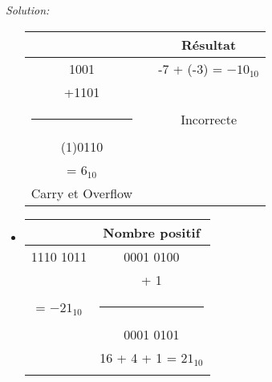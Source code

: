 \documentclass{article}
\newenvironment{solution}
    {\textit{Solution:}}
    {}
\begin{document}
\begin{solution}
\begin{itemize}
        \begin{tabular}{|c|c|c|}
        \hline
        &  & Résultat \\
        \hline
        \hspace{6pt}1001       &                         &       -7 + (-3) = $-10_{10}$         \\
        +1101                  &               &                                         \\
        \rule{1in}{1pt}             &                  &       Incorrecte                          \\
        (1)0110                &                        &                                         \\
        \hspace{33pt}  = $6_{10}$ \hspace{38pt}  &          &                                   \\
        Carry et Overflow                       &       \hspace{100pt}              &      \hspace{100pt}   \\
        \hline
        \end{tabular}
        
        
        \item
        
        
        \begin{tabular}{|c|c|}
        \hline
        & Nombre positif\\
        \hline    
        1110 1011           &       0001 0100                   \\
        \hspace{101pt}      &       + \hspace{25pt} 1           \\
        = $-21_{10}$        &       \rule{1in}{1pt}             \\
        \hspace{5pt}        &       0001 0101                   \\
        \hspace{5pt}        &       16 + 4 + 1 = $21_{10}$      \\
                            &       \hspace{100pt}              \\
        \hline
        \end{tabular}
        
        \hspace{40pt}
        

\end{itemize}
\end{solution}
\end{document}
